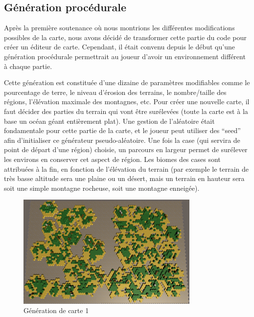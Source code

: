 \documentclass[12pt]{report}
\begin{document}
\subsection{Génération procédurale}

Après la première soutenance où nous montrions les différentes modifications
possibles de la carte, nous avons décidé de transformer cette partie du code
pour créer un éditeur de carte. Cependant, il était convenu depuis le début
qu’une génération procédurale permettrait au joueur d’avoir un environnement
différent à chaque partie.

Cette génération est constituée d’une dizaine de paramètres modifiables comme le
pourcentage de terre, le niveau d’érosion des terrains, le nombre/taille des
régions, l’élévation maximale des montagnes, etc. Pour créer une nouvelle carte,
il faut décider des parties du terrain qui vont être surélevées (toute la carte
est à la base un océan géant entièrement plat). Une gestion de l’aléatoire était
fondamentale pour cette partie de la carte, et le joueur peut utiliser des
“seed” afin d’initialiser ce générateur pseudo-aléatoire. Une fois la case (qui
servira de point de départ d’une région) choisie, un parcours en largeur permet
de surélever les environs en conserver cet aspect de région. Les biomes des
cases sont attribuées à la fin, en fonction de l’élévation du terrain (par
exemple le terrain de très basse altitude sera une plaine ou un désert, mais un
terrain en hauteur sera soit une simple montagne rocheuse, soit une montagne
enneigée).

\begin{figure}[H]
    \centering
    \includegraphics[width=0.8\textwidth]{../report_2/img/MapGen1}
    \caption*{Génération de carte 1}
\end{figure}
\end{document}
